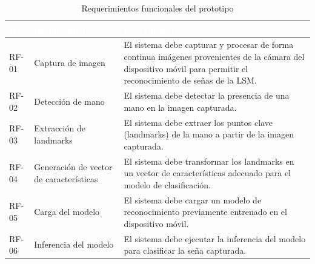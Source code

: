 	{
		
		\small
		\renewcommand{\arraystretch}{1.18}
		
		\begin{table}[H]
			\centering
			\caption{Requerimientos funcionales del prototipo}
			\label{tab:rf}
			
			\begin{tabular}{
					!{\vrule width 0.6pt}
					>{\centering\arraybackslash}p{2cm}
					!{\vrule width 0.6pt}
					>{\centering\arraybackslash}p{5cm}
					!{\vrule width 0.6pt}
					>{\centering\arraybackslash}p{7cm}
					!{\vrule width 0.6pt}
				}
				
				\hline
				
				\textcolor{white}{\textbf{ID}} &
				\textcolor{white}{\textbf{Requerimiento}} &
				\textcolor{white}{\textbf{Descripción}} \\
				
				\hline
				
				RF-01 &
				Captura de imagen &
				El sistema debe capturar y procesar de forma continua imágenes provenientes de la cámara del dispositivo móvil para permitir el reconocimiento de señas de la LSM. \\
				
				\hline
				
				RF-02 &
				Detección de mano &
				El sistema debe detectar la presencia de una mano en la imagen capturada. \\
				
				\hline
				
				RF-03 &
				Extracción de landmarks &
				El sistema debe extraer los puntos clave (landmarks) de la mano a partir de la imagen capturada. \\
				
				\hline
				
				RF-04 &
				Generación de vector de características &
				El sistema debe transformar los landmarks en un vector de características adecuado para el modelo de clasificación. \\
				
				\hline
				
				RF-05 &
				Carga del modelo &
				El sistema debe cargar un modelo de reconocimiento previamente entrenado en el dispositivo móvil. \\
				
				\hline
				
				RF-06 &
				Inferencia del modelo &
				El sistema debe ejecutar la inferencia del modelo para clasificar la seña capturada. \\
				

\end{tabular}
\end{table}}
